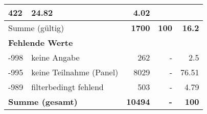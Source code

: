 \begin{longtable}{lXrrr}
       \num{422} &
       \num[round-mode=places,round-precision=2]{24.82} &
         \num[round-mode=places,round-precision=2]{4.02} \\
     \midrule
     \multicolumn{2}{l}{Summe (gültig)} &
       \textbf{\num{1700}} &
     \textbf{\num{100}} &
       \textbf{\num[round-mode=places,round-precision=2]{16.2}} \\
     \multicolumn{5}{l}{\textbf{Fehlende Werte}}\\
       -998 &
       keine Angabe &
         \num{262} &
        - &
         \num[round-mode=places,round-precision=2]{2.5} \\
       -995 &
       keine Teilnahme (Panel) &
         \num{8029} &
        - &
         \num[round-mode=places,round-precision=2]{76.51} \\
       -989 &
       filterbedingt fehlend &
         \num{503} &
        - &
         \num[round-mode=places,round-precision=2]{4.79} \\
     \midrule
     \multicolumn{2}{l}{\textbf{Summe (gesamt)}} &
          \textbf{\num{10494}} &
        \textbf{-} &
        \textbf{\num{100}} \\
     \bottomrule
     \end{longtable}
     

